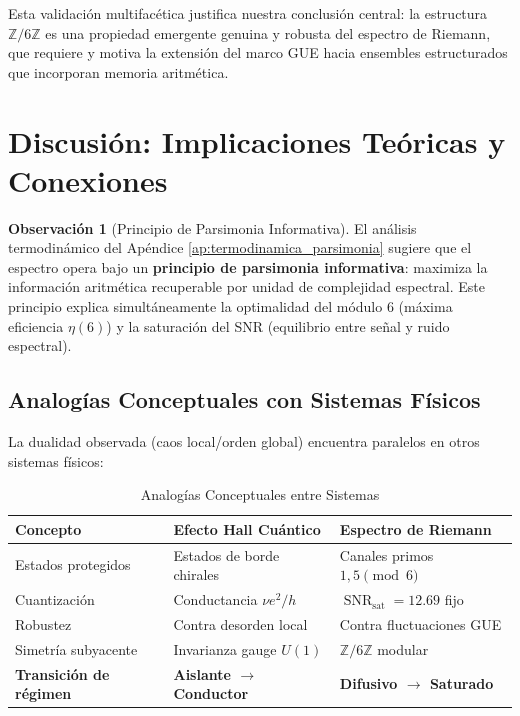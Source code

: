 \documentclass[12pt, a4paper]{article}
\theoremstyle{plain}
\theoremstyle{definition}
\newtheorem{observacion}[teorema]{Observación}
\theoremstyle{remark}
\newcommand{\SNR}{\operatorname{SNR}}
\begin{document}
Esta validación multifacética justifica nuestra conclusión central: la estructura $\mathbb{Z}/6\mathbb{Z}$ es una propiedad emergente genuina y robusta del espectro de Riemann, que requiere y motiva la extensión del marco GUE hacia ensembles estructurados que incorporan memoria aritmética.

\section{Discusión: Implicaciones Teóricas y Conexiones}
\label{sec:discusion}

\begin{observacion}[Principio de Parsimonia Informativa]
El análisis termodinámico del Apéndice \ref{ap:termodinamica_parsimonia} sugiere que el espectro opera bajo un \textbf{principio de parsimonia informativa}: maximiza la información aritmética recuperable por unidad de complejidad espectral. Este principio explica simultáneamente la optimalidad del módulo 6 (máxima eficiencia $\eta(6)$) y la saturación del SNR (equilibrio entre señal y ruido espectral).
\end{observacion}

\subsection{Analogías Conceptuales con Sistemas Físicos}
\label{subsec:analogias}

La dualidad observada (caos local/orden global) encuentra paralelos en otros sistemas físicos:

\begin{table}[H]
\centering
\caption{Analogías Conceptuales entre Sistemas}
\label{tab:analogias}
\begin{tabular}{@{}lll@{}}
\toprule
\textbf{Concepto} & \textbf{Efecto Hall Cuántico} & \textbf{Espectro de Riemann} \\
\midrule
Estados protegidos & Estados de borde chirales & Canales primos $1,5 \pmod{6}$ \\
Cuantización & Conductancia $\nu e^2/h$ & $\SNR_{\text{sat}} = 12.69$ fijo \\
Robustez & Contra desorden local & Contra fluctuaciones GUE \\
Simetría subyacente & Invarianza gauge $U(1)$ & $\mathbb{Z}/6\mathbb{Z}$ modular \\
\hline
\textbf{Transición de régimen} & \textbf{Aislante $\to$ Conductor} & \textbf{Difusivo $\to$ Saturado} \\
\bottomrule
\end{tabular}
\end{table}
\end{document}
